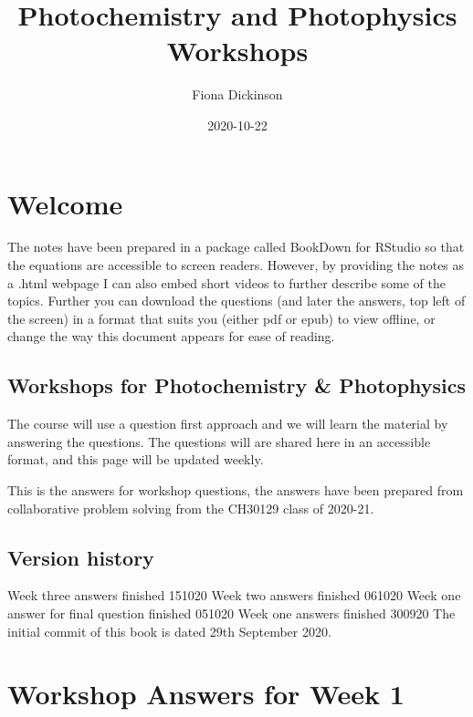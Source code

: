 \documentclass[
]{book}
\title{Photochemistry and Photophysics Workshops}
\author{Fiona Dickinson}
\date{2020-10-22}
\begin{document}
\maketitle

{
\setcounter{tocdepth}{1}
\tableofcontents
}
\hypertarget{welcome}{%
\chapter*{Welcome}\label{welcome}}

The notes have been prepared in a package called BookDown for RStudio so that the equations are accessible to screen readers. However, by providing the notes as a .html webpage I can also embed short videos to further describe some of the topics. Further you can download the questions (and later the answers, top left of the screen) in a format that suits you (either pdf or epub) to view offline, or change the way this document appears for ease of reading.

\hypertarget{workshops-for-photochemistry-photophysics}{%
\section*{Workshops for Photochemistry \& Photophysics}\label{workshops-for-photochemistry-photophysics}}

The course will use a question first approach and we will learn the material by answering the questions. The questions will are shared here in an accessible format, and this page will be updated weekly.

This is the answers for workshop questions, the answers have been prepared from collaborative problem solving from the CH30129 class of 2020-21.

\hypertarget{version-history}{%
\section*{Version history}\label{version-history}}

Week three answers finished 151020
Week two answers finished 061020
Week one answer for final question finished 051020
Week one answers finished 300920
The initial commit of this book is dated 29th September 2020.

\hypertarget{ch:Workshop1}{%
\chapter{Workshop Answers for Week 1}\label{ch:Workshop1}}
\end{document}
